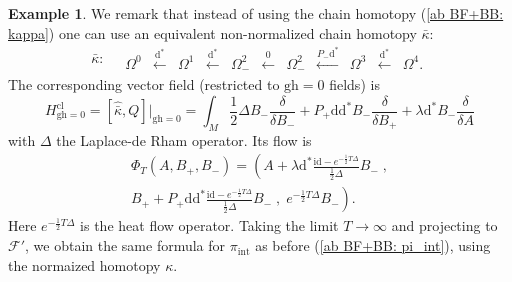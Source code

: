 \documentclass{amsart}
\theoremstyle{plain} %
\theoremstyle{definition}
\newtheorem{expl}[thm]{Example}
\theoremstyle{remark}
\newcommand{\mr}{\mathrm}
\newcommand{\ra}{\rightarrow}
\newcommand{\wh}{\widehat}
\newcommand{\F}{\mathcal{F}}
\newcommand{\ii}{\mathrm{int}}
\newcommand{\cl}{\mathrm{cl}}
\newcommand{\xla}{\xleftarrow}
\newcommand{\dr}{\mathrm{d}}
\begin{document}
\begin{expl}
    We remark that instead of using the chain homotopy (\ref{ab BF+BB: kappa}) one can use an equivalent non-normalized chain homotopy $\bar\kappa$:
    \begin{equation}
    \bar\kappa\colon\quad
    \begin{array}{ccccccccccc} 
       \Omega^0 &\xla{\dr^*} &\Omega^1 &\xla{\dr^* }& \Omega^2_- &\xla{0}& \Omega^2_-& \xla{P_-\dr^* } &\Omega^3 &\xla{\dr^*} &\Omega^4.
    \end{array}
\end{equation}
The corresponding vector field (restricted to $\mr{gh}=0$ fields) is
\begin{equation}
    H^\cl_{\mr{gh}=0}= [\wh{\bar\kappa},Q]\Big|_{\mr{gh}=0} =\int_M \frac12 \Delta B_- \frac{\delta}{\delta B_-}+P_+ \dr \dr^* B_-\frac{\delta}{\delta B_+}+\lambda \dr^* B_-\frac{\delta}{\delta A}
\end{equation}
with $\Delta$ the Laplace-de Rham operator.
Its flow is
\begin{multline}
    \Phi_T(A,B_+,B_-)=\left( A+\lambda \dr^* \frac{\mr{id}-e^{-\frac12 T\Delta}}{\frac12 \Delta}B_-\;,\right.\\ \left.
    B_++P_+ \dr \dr^* \frac{\mr{id}-e^{-\frac12 T\Delta}}{\frac12 \Delta}B_-\;,\; e^{-\frac12 T\Delta}B_-
    \right).
\end{multline}
Here $e^{-\frac12 T\Delta}$ is the heat flow operator.
Taking the limit $T\ra\infty$ and projecting to $\F'$, we obtain the same formula for $\pi_\ii$ as before (\ref{ab BF+BB: pi_int}), using the normaized homotopy $\kappa$.
\end{expl}
\end{document}

